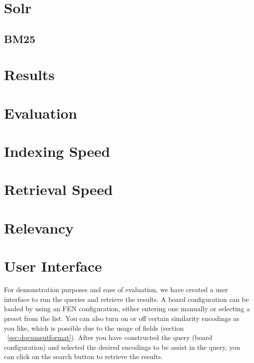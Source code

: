 \documentclass[11pt]{article}
\begin{document}
    \section{Solr}

    \subsection{BM25}


    \section{Results}

    \section{Evaluation}

    \section{Indexing Speed}

    \section{Retrieval Speed}


    \section{Relevancy}




    \section{User Interface}

    For demonstration purposes and ease of evaluation, we have created a user interface to run the queries and retrieve the results. A board configuration can be loaded by using an FEN configuration, either entering one manually or selecting a preset from the list. You can also turn on or off certain similarity encodings as you like, which is possible due to the usage of fields (section ~\ref{sec:documentformat}). After you have constructed the query (board configuration) and selected the desired encodings to be assist in the query, you can click on the search button to retrieve the results.
\end{document}
